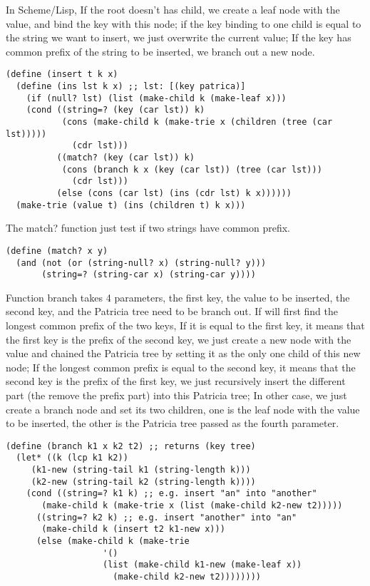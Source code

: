 \documentclass{article}
\begin{document}
In Scheme/Lisp, If the root doesn't has child, we create a leaf node
with the value, and bind the key with this node; if the key binding to
one child is equal to the string we want to insert, we just overwrite
the current value; If the key has common prefix of the string to be
inserted, we branch out a new node.

\lstset{language=lisp}
\begin{lstlisting}
(define (insert t k x)
  (define (ins lst k x) ;; lst: [(key patrica)]
    (if (null? lst) (list (make-child k (make-leaf x)))
	(cond ((string=? (key (car lst)) k)
	       (cons (make-child k (make-trie x (children (tree (car lst)))))
		     (cdr lst)))
	      ((match? (key (car lst)) k)
	       (cons (branch k x (key (car lst)) (tree (car lst)))
		     (cdr lst)))
	      (else (cons (car lst) (ins (cdr lst) k x))))))
  (make-trie (value t) (ins (children t) k x)))
\end{lstlisting}

The match? function just test if two strings have common prefix.

\begin{lstlisting}
(define (match? x y)
  (and (not (or (string-null? x) (string-null? y)))
       (string=? (string-car x) (string-car y))))
\end{lstlisting}

Function branch takes 4 parameters, the first key, the value to be
inserted, the second key, and the Patricia tree need to be branch
out. If will first find the longest common prefix of the two keys, If
it is equal to the first key, it means that the first key is the prefix of
the second key, we just create a new node with the value and chained
the Patricia tree by setting it as the only one child of this new
node; If the longest common prefix is equal to the second key, it
means that the second key is the prefix of the first key, we just
recursively insert the different part (the remove the prefix part)
into this Patricia tree; In other case, we just create a branch node
and set its two children, one is the leaf node with the value to be
inserted, the other is the Patricia tree passed as the fourth parameter.

\begin{lstlisting}
(define (branch k1 x k2 t2) ;; returns (key tree)
  (let* ((k (lcp k1 k2))
	 (k1-new (string-tail k1 (string-length k)))
	 (k2-new (string-tail k2 (string-length k))))
    (cond ((string=? k1 k) ;; e.g. insert "an" into "another"
	   (make-child k (make-trie x (list (make-child k2-new t2)))))
	  ((string=? k2 k) ;; e.g. insert "another" into "an"
	   (make-child k (insert t2 k1-new x)))
	  (else (make-child k (make-trie
			       '()
			       (list (make-child k1-new (make-leaf x))
				     (make-child k2-new t2))))))))
\end{lstlisting}
\end{document}
